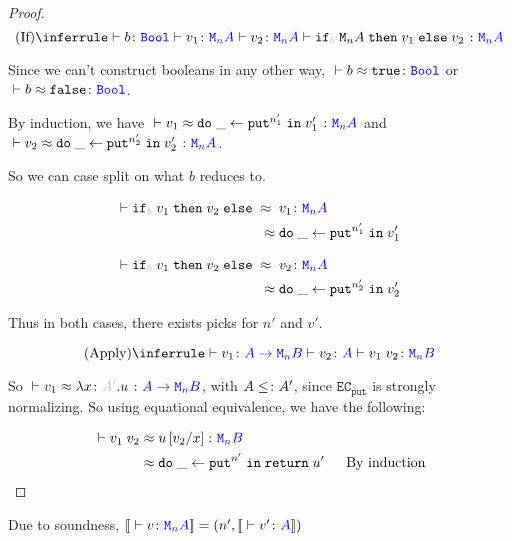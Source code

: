 \documentclass{Report}
\newcommand{\zberelation}[3]{\berelation{}{#1}{#2}{#3}}
\newcommand\ztyperelation[2]{\typerelation{}{#1}{#2}}
\renewcommand\put[0]{\texttt{put}}
\newcommand\ecput[0]{\texttt{EC}_\put}
\newcommand\mna[0]{\M{n}{A}}
\newcommand\mnb[0]{\M{n}{B}}
\begin{document}
\begin{proof}
\begin{equation}
    \ntreeruleIII{If}{\ztyperelation{b}{\B}}{\ztyperelation{v_1}{\mna}}{\ztyperelation{v_2}{\mna}}{\ztyperelation{\pifthenelse{b}{\mna}{v_1}{v_2}}{\mna}}    
\end{equation}

Since we can't construct booleans in any other way, $\zberelation{b}{\t}{\B}$ or $\zberelation{b}{\f}{\B}$.

By induction, we have $\zberelation{v_1}{\doin{\_}{\put^{n_1'}}{v_1'}}{\mna}$ and $\zberelation{v_2}{\doin{\_}{\put^{n_2'}}{v_2'}}{\mna}$.

So we can case split on what $b$ reduces to.

\case{$\zberelation{b}{\t}{\B}$}
\begin{align}
   \zberelation{\pifthenelse{b}{v_1}{v_2}}{&\s v_1}{\mna}\\
   \beequiv&\s \doin{\_}{\put^{n_1'}}{v_1'}
\end{align}

\case{$\zberelation{b}{\f}{\B}$}
\begin{align}
    \zberelation{\pifthenelse{b}{v_1}{v_2}}{&\s v_2}{\mna}\\
    \beequiv&\s \doin{\_}{\put^{n_2'}}{v_2'}
 \end{align} 

 Thus in both cases, there exists picks for $n'$ and $v'$.


 \begin{equation}
     \ntreeruleII{Apply}{\ztyperelation{v_1}{\fntype{A}{\mnb}}}{\ztyperelation{v_2}{A}}{\ztyperelation{\apply{v_1}{v_2}}{\mnb}}
 \end{equation}

 So $\zberelation{v_1}{\lam{x}{A'}{u}}{\fntype{A}{\mnb}}$, with $A \leq\colon A'$, since $\ecput$ is strongly normalizing. So using equational equivalence, we have the following:

 \begin{align}
     \zberelation{\apply{v_1}{v_2}}{&\s u\ssub{x}{v_2}}{\mnb}\\
     \beequiv&\s \doin{\_}{\put^{n'}}{\return{u'}}\qt{By induction}
 \end{align}

\end{proof}

\begin{corollary}
    Due to soundness, $\deno{\ztyperelation{v}{\mna}} = (n', \deno{\ztyperelation{v'}{A}})$
\end{corollary}
\end{document}
